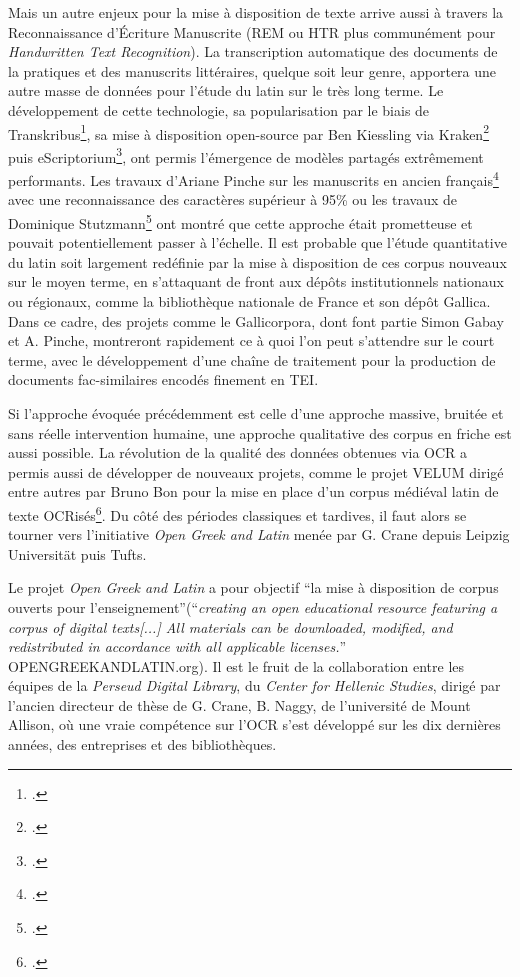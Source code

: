 Mais un autre enjeux pour la mise à disposition de texte arrive aussi à travers la Reconnaissance d'Écriture Manuscrite (REM ou HTR plus communément pour \textit{Handwritten Text Recognition}). La transcription automatique des documents de la pratiques et des manuscrits littéraires, quelque soit leur genre, apportera une autre masse de données pour l'étude du latin sur le très long terme. Le développement de cette technologie, sa popularisation par le biais de Transkribus\footcite{kahle2017transkribus}, sa mise à disposition open-source par Ben Kiessling via Kraken\footcite{kiessling2019kraken} puis eScriptorium\footcite{kiessling_escripto}, ont permis l'émergence de modèles partagés extrêmement performants. Les travaux d'Ariane Pinche sur les manuscrits en ancien français\footcite{Pinche_CREMMA_Medieval_an_2021} avec une reconnaissance des caractères supérieur à 95\% ou les travaux de Dominique Stutzmann\footcite{hazem2020books} ont montré que cette approche était prometteuse et pouvait potentiellement passer à l'échelle. Il est probable que l'étude quantitative du latin soit largement redéfinie par la mise à disposition de ces corpus nouveaux sur le moyen terme, en s'attaquant de front aux dépôts institutionnels nationaux ou régionaux, comme la bibliothèque nationale de France et son dépôt Gallica. Dans ce cadre, des projets comme le Gallicorpora, dont font partie Simon Gabay et A. Pinche, montreront rapidement ce à quoi l'on peut s'attendre sur le court terme, avec le développement d'une chaîne de traitement pour la production de documents fac-similaires encodés finement en TEI.

Si l'approche évoquée précédemment est celle d'une approche massive, bruitée et sans réelle intervention humaine, une approche qualitative des corpus en friche est aussi possible. La révolution de la qualité des données obtenues via OCR a permis aussi de développer de nouveaux projets, comme le projet VELUM dirigé entre autres par Bruno Bon pour la mise en place d'un corpus médiéval latin de texte OCRisés\footcite{bon2019challenges}. Du côté des périodes classiques et tardives, il faut alors se tourner vers l'initiative \textit{Open Greek and Latin} menée par G. Crane depuis Leipzig Universität puis Tufts.

Le projet \textit{Open Greek and Latin} a pour objectif ``la mise à disposition de corpus ouverts pour l'enseignement''(``\textit{creating an open educational resource featuring a corpus of digital texts{[...]} All materials can be downloaded, modified, and redistributed in accordance with all applicable licenses.}'' OPENGREEKANDLATIN.org). Il est le fruit de la collaboration entre les équipes de la \textit{Perseud Digital Library}, du \textit{Center for Hellenic Studies}, dirigé par l'ancien directeur de thèse de G. Crane, B. Naggy, de l'université de Mount Allison, où une vraie compétence sur l'OCR s'est développé sur les dix dernières années, des entreprises et des bibliothèques.

